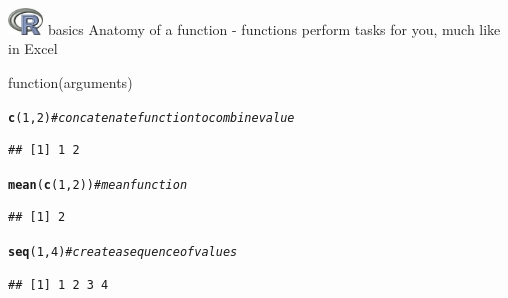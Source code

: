 \documentclass[xcolor=svgnames]{beamer}\usepackage[]{graphicx}\usepackage[]{color}
\makeatletter
\newcommand{\hlnum}[1]{\textcolor[rgb]{0.686,0.059,0.569}{#1}}%
\newcommand{\hlcom}[1]{\textcolor[rgb]{0.678,0.584,0.686}{\textit{#1}}}%
\newcommand{\hlstd}[1]{\textcolor[rgb]{0.345,0.345,0.345}{#1}}%
\newcommand{\hlkwd}[1]{\textcolor[rgb]{0.737,0.353,0.396}{\textbf{#1}}}%
\newenvironment{kframe}{%
 \def\at@end@of@kframe{}%
 \ifinner\ifhmode%
  \def\at@end@of@kframe{\end{minipage}}%
  \begin{minipage}{\columnwidth}%
 \fi\fi%
 \def\FrameCommand##1{\hskip\@totalleftmargin \hskip-\fboxsep
 \colorbox{shadecolor}{##1}\hskip-\fboxsep
     \hskip-\linewidth \hskip-\@totalleftmargin \hskip\columnwidth}%
 \MakeFramed {\advance\hsize-\width
   \@totalleftmargin\z@ \linewidth\hsize
   \@setminipage}}%
 {\par\unskip\endMakeFramed%
 \at@end@of@kframe}
\newenvironment{knitrout}{}{} %
\makeatother
\begin{document}
\begin{frame}[fragile]{\includegraphics[width=0.07\textwidth]{Rlogo.jpg} \hspace{0.01in} basics}
Anatomy of a function - functions perform tasks for you, much like in Excel
\begin{center}
\Large
function(arguments)
\end{center}
\begin{knitrout}
\color{fgcolor}\begin{kframe}
\begin{alltt}
\hlkwd{c}\hlstd{(}\hlnum{1}\hlstd{,} \hlnum{2}\hlstd{)} \hlcom{# concatenate function to combine value}
\end{alltt}
\begin{verbatim}
## [1] 1 2
\end{verbatim}
\begin{alltt}
\hlkwd{mean}\hlstd{(}\hlkwd{c}\hlstd{(}\hlnum{1}\hlstd{,} \hlnum{2}\hlstd{))} \hlcom{# mean function}
\end{alltt}
\begin{verbatim}
## [1] 2
\end{verbatim}
\begin{alltt}
\hlkwd{seq}\hlstd{(}\hlnum{1}\hlstd{,} \hlnum{4}\hlstd{)} \hlcom{# create a sequence of values}
\end{alltt}
\begin{verbatim}
## [1] 1 2 3 4
\end{verbatim}
\end{kframe}
\end{knitrout}
\end{frame}
\end{document}

